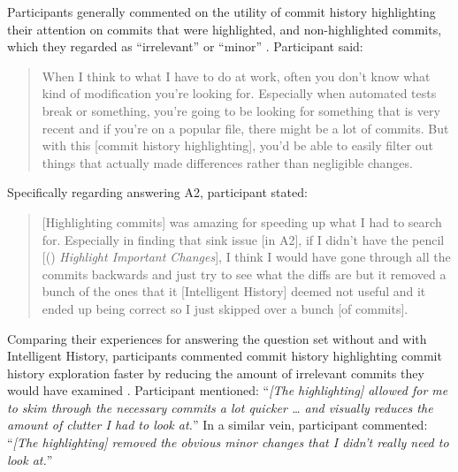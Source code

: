 Participants generally commented on the utility of commit history highlighting  their attention on commits that were highlighted, 
and  non-highlighted commits, which they regarded as ``irrelevant'' or ``minor'' .
Participant  said:

\begin{quote}
  When I think to what I have to do at work, 
  often you don’t know what kind of modification you’re looking for. 
  Especially when automated tests break or something, 
  you’re going to be looking for something that is very recent and if you’re on a popular file, 
  there might be a lot of commits. 
  But with this [commit history highlighting], 
  you’d be able to easily filter out things that actually made differences rather than negligible changes.
\end{quote}

Specifically regarding answering A2, participant  stated:

\begin{quote}
  [Highlighting commits] was amazing for speeding up what I had to search for. 
  Especially in finding that sink issue [in A2], if I didn’t have the pencil 
  [() \textit{Highlight Important Changes}], 
  I think I would have gone through all the commits backwards and just try to see what the diffs are 
  but it removed a bunch of the ones that it [Intelligent History] deemed not useful 
  and it ended up being correct so I just skipped over a bunch [of commits].
\end{quote}

Comparing their experiences for answering the question set without and with Intelligent History, 
participants commented  commit history highlighting  commit history exploration faster 
by reducing the amount of irrelevant commits they would have examined .
Participant  mentioned: 
``\textit{[The highlighting] allowed for me to skim through the necessary commits a lot quicker \dots 
and visually reduces the amount of clutter I had to look at.}''
In a similar vein, participant  commented:
``\textit{[The highlighting] removed the obvious minor changes that I didn’t really need to look at.}''

